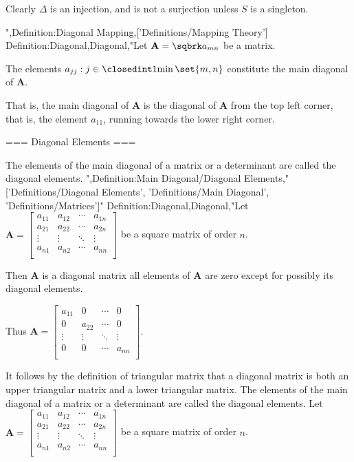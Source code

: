 Clearly $\Delta$ is an injection, and is not a surjection unless $S$ is a singleton.

",Definition:Diagonal Mapping,['Definitions/Mapping Theory']
Definition:Diagonal,Diagonal,"Let $\mathbf A = \sqbrk a_{m n}$ be a matrix.

The elements $a_{j j}: j \in \closedint 1 {\min \set {m, n} }$ constitute the main diagonal of $\mathbf A$.

That is, the main diagonal of $\mathbf A$ is the diagonal of $\mathbf A$ from the top left corner, that is, the element $a_{1 1}$, running towards the lower right corner.


=== Diagonal Elements ===

The elements of the main diagonal of a matrix or a determinant are called the diagonal elements.
",Definition:Main Diagonal/Diagonal Elements,"['Definitions/Diagonal Elements', 'Definitions/Main Diagonal', 'Definitions/Matrices']"
Definition:Diagonal,Diagonal,"Let $\mathbf A = \begin{bmatrix}
a_{11} & a_{12} & \cdots & a_{1n} \\
a_{21} & a_{22} & \cdots & a_{2n} \\
\vdots & \vdots & \ddots & \vdots \\
a_{n1} & a_{n2} & \cdots & a_{nn} \\
\end{bmatrix}$ be a square matrix of order $n$.

Then $\mathbf A$ is a diagonal matrix  all elements of $\mathbf A$ are zero except for possibly its diagonal elements.


Thus $\mathbf A = \begin{bmatrix}
a_{11} & 0 & \cdots & 0 \\
0 & a_{22} & \cdots & 0 \\
\vdots & \vdots & \ddots & \vdots \\
0 & 0 & \cdots & a_{nn} \\
\end{bmatrix}$.


It follows by the definition of triangular matrix that a diagonal matrix is both an upper triangular matrix and a lower triangular matrix.
The elements of the main diagonal of a matrix or a determinant are called the diagonal elements.
Let $\mathbf A = \begin{bmatrix}
a_{11} & a_{12} & \cdots & a_{1n} \\
a_{21} & a_{22} & \cdots & a_{2n} \\
\vdots & \vdots & \ddots & \vdots \\
a_{n1} & a_{n2} & \cdots & a_{nn} \\
\end{bmatrix}$ be a square matrix of order $n$.

